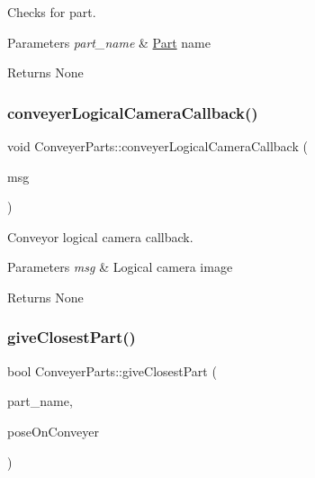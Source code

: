 Checks for part. 


\begin{DoxyParams}{Parameters}
{\em part\+\_\+name} & \hyperlink{structPart}{Part} name \\
\hline
\end{DoxyParams}
\begin{DoxyReturn}{Returns}
None 
\end{DoxyReturn}
\mbox{\label{classConveyerParts_a4e63b43cf4de0e31ed58a89b1fc2654c}} 
\subsubsection{\texorpdfstring{conveyer\+Logical\+Camera\+Callback()}{conveyerLogicalCameraCallback()}}
{\footnotesize\ttfamily void Conveyer\+Parts\+::conveyer\+Logical\+Camera\+Callback (\begin{DoxyParamCaption}\item[{const nist\+\_\+gear\+::\+Logical\+Camera\+Image \&}]{msg }\end{DoxyParamCaption})}



Conveyor logical camera callback. 


\begin{DoxyParams}{Parameters}
{\em msg} & Logical camera image \\
\hline
\end{DoxyParams}
\begin{DoxyReturn}{Returns}
None 
\end{DoxyReturn}
\mbox{\label{classConveyerParts_a57188292039617070e9042ad3133a5f8}} 
\subsubsection{\texorpdfstring{give\+Closest\+Part()}{giveClosestPart()}}
{\footnotesize\ttfamily bool Conveyer\+Parts\+::give\+Closest\+Part (\begin{DoxyParamCaption}\item[{const std\+::string \&}]{part\+\_\+name,  }\item[{geometry\+\_\+msgs\+::\+Pose \&}]{pose\+On\+Conveyer }\end{DoxyParamCaption})}



